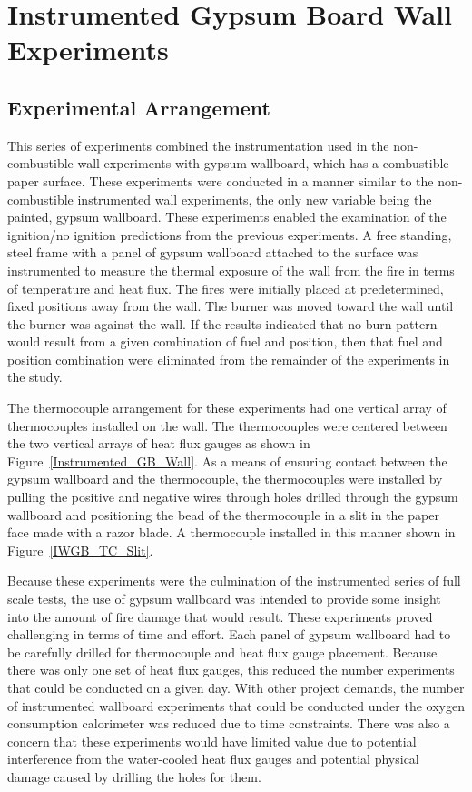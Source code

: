 \documentclass[twoside]{uocthesis}
\begin{document}
{\chapter{Instrumented Gypsum Board Wall Experiments}

\section{Experimental Arrangement}
This series of experiments combined the instrumentation used in the non-combustible wall experiments with gypsum wallboard, which has a combustible paper surface. These experiments were conducted in a manner similar to the non-combustible instrumented wall experiments, the only new variable being the painted, gypsum wallboard. These experiments enabled the examination of the ignition/no ignition predictions from the previous experiments.  A free standing, steel frame with a panel of gypsum wallboard attached to the surface was instrumented to measure the thermal exposure of the wall from the fire in terms of temperature and heat flux.  The fires were initially placed at predetermined, fixed positions away from the wall. The burner was moved toward the wall until the burner was against the wall.  If the results indicated that no burn pattern would result from a given combination of fuel and position, then that fuel and position combination were eliminated from the remainder of the experiments in the study.

The thermocouple arrangement for these experiments had one vertical array of thermocouples installed on the wall.  The thermocouples were centered between the two vertical arrays of heat flux gauges as shown in Figure~\ref{Instrumented_GB_Wall}.  As a means of ensuring contact between the gypsum wallboard and the thermocouple, the thermocouples were installed by pulling the positive and negative wires through holes drilled through the gypsum wallboard and positioning the bead of the thermocouple in a slit in the paper face made with a razor blade.  A thermocouple installed in this manner shown in Figure~\ref{IWGB_TC_Slit}.

Because these experiments were the culmination of the instrumented series of full scale tests, the use of gypsum wallboard was intended to provide some insight into the amount of fire damage that would result. These experiments proved challenging in terms of time and effort.  Each panel of gypsum wallboard had to be carefully drilled for thermocouple and heat flux gauge placement. Because there was only one set of heat flux gauges, this reduced the number experiments that could be conducted on a given day.  With other project demands, the number of instrumented wallboard experiments that could be conducted under the oxygen consumption calorimeter was reduced due to time constraints. There was also a concern that these experiments would have limited value due to potential interference from the water-cooled heat flux gauges and potential physical damage caused by drilling the holes for them.

}
\end{document}

